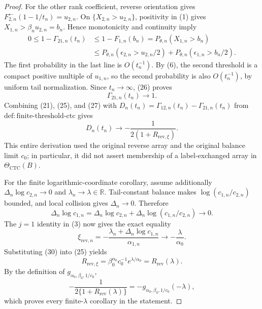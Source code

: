 \documentclass{article}
\begin{document}
\begin{proof}
For the other rank coefficient, reverse orientation gives
\(F_{2,n}^{\leftarrow}(1-1/t_n)=u_{2,n}\). On
\(\{X_{2,n}>u_{2,n}\}\), positivity in (1) gives
\(X_{1,n}>\beta_n u_{2,n}=b_n\). Hence monotonicity and continuity imply
\[
\begin{aligned}
0\leq1-\Gamma_{21,n}(t_n)
&\leq1-F_{1,n}(b_n)
=P_{\theta,n}(X_{1,n}>b_n)\\
&\leq P_{\theta,n}(\epsilon_{2,n}>u_{2,n}/2)
+P_{\theta,n}(\epsilon_{1,n}>b_n/2).
\end{aligned}
\tag{26}
\]
The first probability in the last line is \(O(t_n^{-1})\). By (6), the
second threshold is a compact positive multiple of \(u_{1,n}\), so the
second probability is also \(O(t_n^{-1})\), by uniform tail normalization.
Since \(t_n\to\infty\), (26) proves
\[
\Gamma_{21,n}(t_n)\longrightarrow1.
\tag{27}
\]
Combining (21), (25), and (27) with
\(D_n(t_n)=\Gamma_{12,n}(t_n)-\Gamma_{21,n}(t_n)\) from
\(\mathrm{def{:}finite\text{-}threshold\text{-}ctc}\) gives
\[
D_n(t_n)\longrightarrow-\frac{1}{2(1+R_{\mathrm{rev},\xi})}.
\tag{28}
\]
This entire derivation used the original reverse array and the original
balance limit \(c_0\); in particular, it did not assert membership of a
label-exchanged array in \(\Theta_{\mathrm{CTC}}(B)\).

For the finite logarithmic-coordinate corollary, assume additionally
\(\Delta_n\log c_{2,n}\to0\) and \(\lambda_n\to\lambda\in\mathbb R\).
Tail-constant balance makes \(\log(c_{1,n}/c_{2,n})\) bounded, and local
collision gives \(\Delta_n\to0\). Therefore
\[
\Delta_n\log c_{1,n}
=\Delta_n\log c_{2,n}
+\Delta_n\log(c_{1,n}/c_{2,n})
\longrightarrow0.
\tag{29}
\]
The \(j=1\) identity in (3) now gives the exact equality
\[
\xi_{\mathrm{rev},n}
=-\frac{\lambda_n+\Delta_n\log c_{1,n}}{\alpha_{1,n}}
\longrightarrow-\frac{\lambda}{\alpha_0}.
\tag{30}
\]
Substituting (30) into (25) yields
\[
R_{\mathrm{rev},\xi}
=\beta_0^{\alpha_0}c_0^{-1}e^{\lambda/\alpha_0}
=R_{\mathrm{rev}}(\lambda).
\tag{31}
\]
By the definition of \(g_{\alpha_0,\beta_0,1/c_0}\),
\[
-\frac{1}{2\{1+R_{\mathrm{rev}}(\lambda)\}}
=-g_{\alpha_0,\beta_0,1/c_0}(-\lambda),
\tag{32}
\]
which proves every finite-\(\lambda\) corollary in the statement.


\end{proof}
\end{document}
